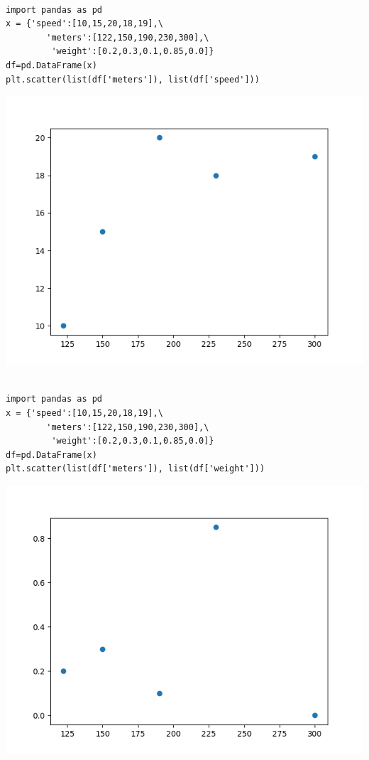 \documentclass[11pt]{article}
\begin{document}
\begin{verbatim}

import pandas as pd
x = {'speed':[10,15,20,18,19],\
        'meters':[122,150,190,230,300],\
         'weight':[0.2,0.3,0.1,0.85,0.0]}
df=pd.DataFrame(x)
plt.scatter(list(df['meters']), list(df['speed']))

\end{verbatim}

\begin{center}
\includegraphics[width=.9\linewidth]{fig6.png}
\end{center}

\begin{verbatim}

import pandas as pd
x = {'speed':[10,15,20,18,19],\
        'meters':[122,150,190,230,300],\
         'weight':[0.2,0.3,0.1,0.85,0.0]}
df=pd.DataFrame(x)
plt.scatter(list(df['meters']), list(df['weight']))

\end{verbatim}

\begin{center}
\includegraphics[width=.9\linewidth]{fig7.png}
\end{center}
\end{document}
